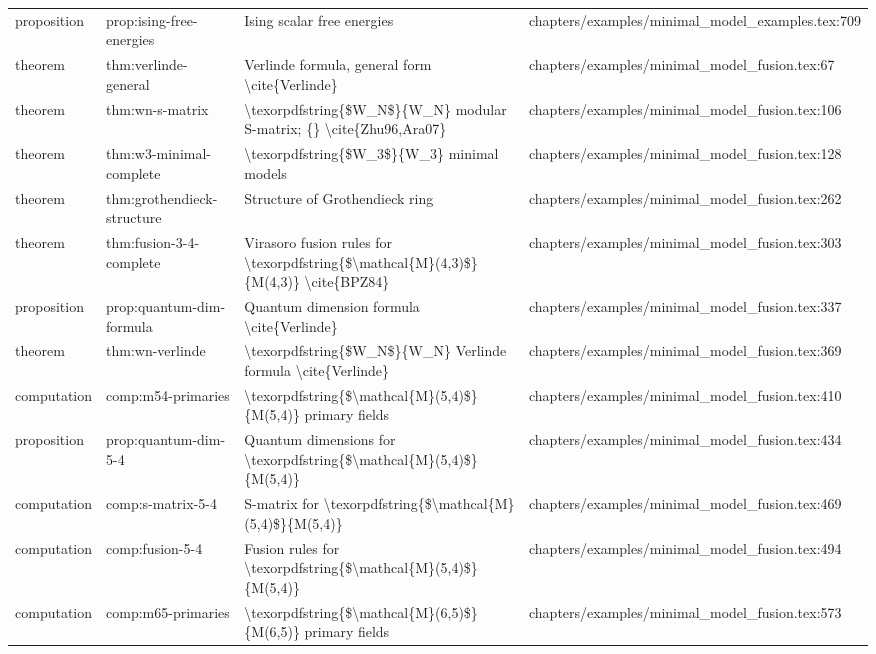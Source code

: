 \documentclass[11pt]{article}
\begin{document}
\begin{longtable}{L{0.10\textwidth}L{0.26\textwidth}L{0.42\textwidth}L{0.22\textwidth}}
proposition & prop:ising-free-energies & Ising scalar free energies & chapters/examples/minimal\_model\_examples.tex:709\\
theorem & thm:verlinde-general & Verlinde formula, general form \textbackslash{}cite\{Verlinde\} & chapters/examples/minimal\_model\_fusion.tex:67\\
theorem & thm:wn-s-matrix & \textbackslash{}texorpdfstring\{\$W\_N\$\}\{W\_N\} modular S-matrix; \{\} \textbackslash{}cite\{Zhu96,Ara07\} & chapters/examples/minimal\_model\_fusion.tex:106\\
theorem & thm:w3-minimal-complete & \textbackslash{}texorpdfstring\{\$W\_3\$\}\{W\_3\} minimal models & chapters/examples/minimal\_model\_fusion.tex:128\\
theorem & thm:grothendieck-structure & Structure of Grothendieck ring & chapters/examples/minimal\_model\_fusion.tex:262\\
theorem & thm:fusion-3-4-complete & Virasoro fusion rules for \textbackslash{}texorpdfstring\{\$\textbackslash{}mathcal\{M\}(4,3)\$\}\{M(4,3)\} \textbackslash{}cite\{BPZ84\} & chapters/examples/minimal\_model\_fusion.tex:303\\
proposition & prop:quantum-dim-formula & Quantum dimension formula \textbackslash{}cite\{Verlinde\} & chapters/examples/minimal\_model\_fusion.tex:337\\
theorem & thm:wn-verlinde & \textbackslash{}texorpdfstring\{\$W\_N\$\}\{W\_N\} Verlinde formula \textbackslash{}cite\{Verlinde\} & chapters/examples/minimal\_model\_fusion.tex:369\\
computation & comp:m54-primaries & \textbackslash{}texorpdfstring\{\$\textbackslash{}mathcal\{M\}(5,4)\$\}\{M(5,4)\} primary fields & chapters/examples/minimal\_model\_fusion.tex:410\\
proposition & prop:quantum-dim-5-4 & Quantum dimensions for \textbackslash{}texorpdfstring\{\$\textbackslash{}mathcal\{M\}(5,4)\$\}\{M(5,4)\} & chapters/examples/minimal\_model\_fusion.tex:434\\
computation & comp:s-matrix-5-4 & S-matrix for \textbackslash{}texorpdfstring\{\$\textbackslash{}mathcal\{M\}(5,4)\$\}\{M(5,4)\} & chapters/examples/minimal\_model\_fusion.tex:469\\
computation & comp:fusion-5-4 & Fusion rules for \textbackslash{}texorpdfstring\{\$\textbackslash{}mathcal\{M\}(5,4)\$\}\{M(5,4)\} & chapters/examples/minimal\_model\_fusion.tex:494\\
computation & comp:m65-primaries & \textbackslash{}texorpdfstring\{\$\textbackslash{}mathcal\{M\}(6,5)\$\}\{M(6,5)\} primary fields & chapters/examples/minimal\_model\_fusion.tex:573\\

\end{longtable}
\end{document}
